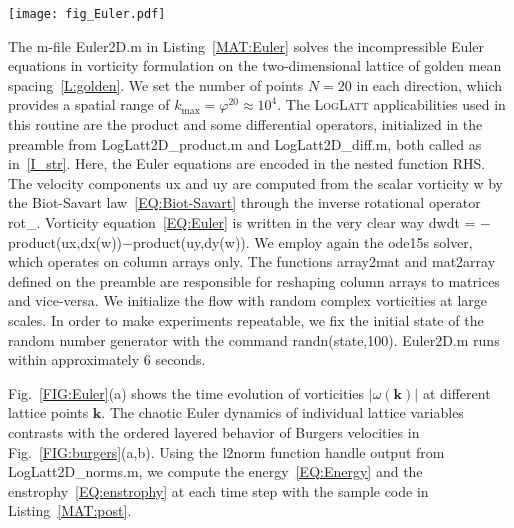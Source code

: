 \documentclass[12pt]{article}
\theoremstyle{definition}
\begin{document}
	\begin{figure*}[t]
		\centering
		\texttt{[image: fig\_Euler.pdf]}
		\caption{Solution of the incompressible Euler equations on the two-dimensional logarithmic lattice with golden mean spacing~\ref{L:golden}: (a)~time evolution of scalar vorticities $|\omega(\mathbf{k})|$ at different points $\mathbf{k}$; colors change from blue to red by increasing $|\mathbf{k}|$; (b)~time evolution of the energy~\eqref{EQ:Energy}; (c)~time evolution of the enstrophy~\eqref{EQ:enstrophy}.}
		\label{FIG:Euler}
	\end{figure*}
	
	The m-file {\mlttfamily Euler2D.m} in Listing~\ref{MAT:Euler} solves the incompressible Euler equations in vorticity formulation on the two-dimensional lattice of golden mean spacing~\ref{L:golden}.
	We set the number of points $N = 20$ in each direction, which provides a spatial range of $k_{\max} = \varphi^{20} \approx 10^4$.
	The \textsc{LogLatt} applicabilities used in this routine are the product and some differential operators, initialized in the preamble from {\mlttfamily LogLatt2D\_product.m} and {\mlttfamily LogLatt2D\_diff.m}, both called as in~\ref{I_str}.
	Here, the Euler equations are encoded in the nested function {\mlttfamily RHS}.
	The velocity components {\mlttfamily ux} and {\mlttfamily uy} are computed from the scalar vorticity {\mlttfamily w} by the Biot-Savart law~\eqref{EQ:Biot-Savart} through the inverse rotational operator {\mlttfamily rot\_}.
	Vorticity equation~\eqref{EQ:Euler} is written in the very clear way {\mlttfamily dwdt = $-$product(ux,dx(w))$-$product(uy,dy(w))}.
	We employ again the {\mlttfamily ode15s} solver, which operates on column arrays only.
	The functions {\mlttfamily array2mat} and {\mlttfamily mat2array} defined on the preamble are responsible for reshaping column arrays to matrices and vice-versa.
	We initialize the flow with random complex vorticities at large scales.
	In order to make experiments repeatable, we fix the initial state of the random number generator with the command {\mlttfamily randn(\textquotesingle state\textquotesingle,100)}.
	{\mlttfamily Euler2D.m} runs within approximately $6$ seconds.
	
	Fig.~\ref{FIG:Euler}(a) shows the time evolution of vorticities $|\omega(\mathbf{k})|$ at different lattice points $\mathbf{k}$.
	The chaotic Euler dynamics of individual lattice variables contrasts with the ordered layered behavior of Burgers velocities in Fig.~\ref{FIG:burgers}(a,b).
	Using the {\mlttfamily l2norm} function handle output from {\mlttfamily LogLatt2D\_norms.m}, we compute the energy~\eqref{EQ:Energy} and the enstrophy~\eqref{EQ:enstrophy} at each time step with the sample code in Listing~\ref{MAT:post}.
	
\end{document}
